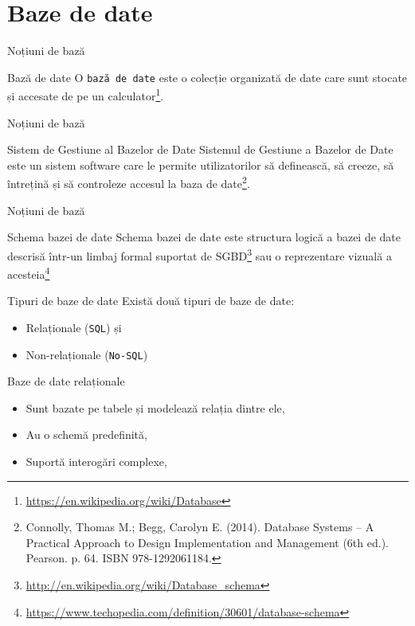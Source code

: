 \documentclass[presentation]{beamer}
\begin{document}
\section{Baze de date}
\label{sec:orgfb15d00}
\begin{frame}[label={sec:org0266291},fragile]{Noțiuni de bază}
 \begin{block}{Bază de date}
\vskip 0.1in
O \texttt{bază de date} este o colecție organizată de date care sunt stocate și accesate de pe un calculator\footnote{\url{https://en.wikipedia.org/wiki/Database}}.
\end{block}
\end{frame}
\begin{frame}[label={sec:org92ddfb8}]{Noțiuni de bază}
\begin{block}{Sistem de Gestiune al Bazelor de Date}
\vskip 0.1in
Sistemul de Gestiune a Bazelor de Date este un sistem software care le permite utilizatorilor să definească, să creeze, să întrețină și să controleze accesul la baza de date\footnote{Connolly, Thomas M.; Begg, Carolyn E. (2014). Database Systems – A Practical Approach to Design Implementation and Management (6th ed.). Pearson. p. 64. ISBN 978-1292061184.}.
\end{block}
\end{frame}
\begin{frame}[label={sec:orga3207eb}]{Noțiuni de bază}
\begin{block}{Schema bazei de date}
\vskip 0.1in
Schema bazei de date este structura logică a bazei de date descrisă într-un limbaj formal suportat de SGBD\footnote{\url{http://en.wikipedia.org/wiki/Database\_schema}} sau o reprezentare vizuală a acesteia\footnote{\url{https://www.techopedia.com/definition/30601/database-schema}}
\end{block}
\end{frame}
\begin{frame}[label={sec:orga38db46},fragile]{Tipuri de baze de date}
 Există două tipuri de baze de date:
\begin{itemize}
\item Relaționale (\texttt{SQL}) și
\item Non-relaționale (\texttt{No-SQL})
\end{itemize}
\end{frame}
\begin{frame}[label={sec:orgc7266b9}]{Baze de date relaționale}
\begin{itemize}
\item Sunt bazate pe tabele și modelează relația dintre ele,
\item Au o schemă predefinită,
\item Suportă interogări complexe,
\end{itemize}
\end{frame}
\end{document}
